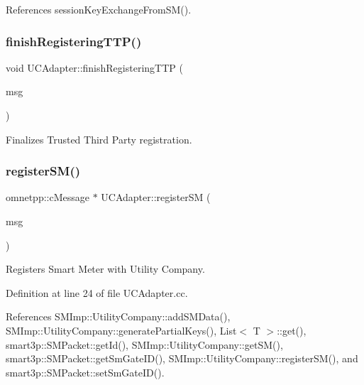References session\+Key\+Exchange\+From\+S\+M().

\mbox{\label{classUCAdapter_ab66ce1ddf0945e8d3af7a9e5bf47b411}} 
\subsubsection{\texorpdfstring{finish\+Registering\+T\+T\+P()}{finishRegisteringTTP()}}
{\footnotesize\ttfamily void U\+C\+Adapter\+::finish\+Registering\+T\+TP (\begin{DoxyParamCaption}\item[{omnetpp\+::c\+Message $\ast$}]{msg }\end{DoxyParamCaption})}

Finalizes Trusted Third Party registration. \mbox{\label{classUCAdapter_a04ad687c0afed4f04b146742a7bd015f}} 
\subsubsection{\texorpdfstring{register\+S\+M()}{registerSM()}}
{\footnotesize\ttfamily omnetpp\+::c\+Message $\ast$ U\+C\+Adapter\+::register\+SM (\begin{DoxyParamCaption}\item[{omnetpp\+::c\+Message $\ast$}]{msg }\end{DoxyParamCaption})}

Registers Smart Meter with Utility Company. 

Definition at line 24 of file U\+C\+Adapter.\+cc.



References S\+M\+Imp\+::\+Utility\+Company\+::add\+S\+M\+Data(), S\+M\+Imp\+::\+Utility\+Company\+::generate\+Partial\+Keys(), List$<$ T $>$\+::get(), smart3p\+::\+S\+M\+Packet\+::get\+Id(), S\+M\+Imp\+::\+Utility\+Company\+::get\+S\+M(), smart3p\+::\+S\+M\+Packet\+::get\+Sm\+Gate\+I\+D(), S\+M\+Imp\+::\+Utility\+Company\+::register\+S\+M(), and smart3p\+::\+S\+M\+Packet\+::set\+Sm\+Gate\+I\+D().

\mbox{\label{classUCAdapter_af76f6694150b1cff5ee307851a501159}} 
